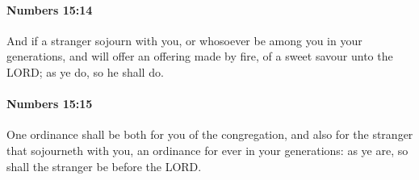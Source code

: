 		\paragraph{Numbers 15:14} %
			\label{NUMBERS-15-14}

			And if a stranger sojourn with you, or whosoever be among you in your generations, and will offer an offering made by fire, of a sweet savour unto the LORD; as ye do, so he shall do.


		\paragraph{Numbers 15:15} %
			\label{NUMBERS-15-15}

			One ordinance shall be both for you of the congregation, and also for the stranger that sojourneth with you, an ordinance for ever in your generations: as ye are, so shall the stranger be before the LORD.

